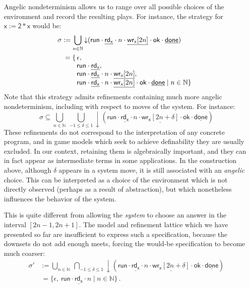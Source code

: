 \documentclass[sigplan,screen]{acmart}
\newcommand{\kw}[1]{\ensuremath{ \mathsf{#1} }}
\begin{document}
Angelic nondeterminism
allows us to range over all possible choices of the environment
and record the resulting plays.
For instance,
the strategy for $\kw{x := 2 * x}$
would be:
\begin{align*}
  \sigma &:=
    \bigcup_{n \in \mathbb{N}} {\downarrow}(
      \kw{run} \cdot
      \underline{\kw{rd}_\kw{x}} \cdot n \cdot
      \underline{\kw{wr}_\kw{x}[2n]} \cdot \kw{ok} \cdot
      \underline{\kw{done}}) \\
  &
      \begin{array}{l@{\,}l}
        = \{ & \epsilon, \\ &
        \kw{run} \cdot
        \underline{\kw{rd}_\kw{x}} ,
        \\ &
        \kw{run} \cdot
        \underline{\kw{rd}_\kw{x}} \cdot n \cdot
        \underline{\kw{wr}_\kw{x}[2n]} ,
        \\ &
        \kw{run} \cdot
        \underline{\kw{rd}_\kw{x}} \cdot n \cdot
        \underline{\kw{wr}_\kw{x}[2n]} \cdot \kw{ok} \cdot
        \underline{\kw{done}}
        \mid n \in \mathbb{N} \}
      \end{array}
\end{align*}
Note that this strategy admits refinements
containing much more angelic nondeterminism,
including with respect to moves of the system.
For instance:
\[
  \sigma \subseteq
    \bigcup_{n \in \mathbb{N}} \:
    \bigcup_{-1 \le \delta \le 1}
    {\downarrow}(
      \kw{run} \cdot
      \underline{\kw{rd}_\kw{x}} \cdot n \cdot
      \underline{\kw{wr}_\kw{x}[2n + \delta]} \cdot \kw{ok} \cdot
      \underline{\kw{done}})
\]
These refinements do not correspond to the interpretation
of any concrete program,
and in game models which seek to achieve definability
they are usually excluded.
In our context, retaining them is algebraically important,
and they can in fact appear as intermediate terms
in some applications.
In the construction above,
although $\delta$ appears in a system move,
it is still associated with an \emph{angelic} choice.
This can be interpreted as a choice of the environment
which is not directly observed
(perhaps as a result of abstraction),
but which nonetheless influences the behavior of the system.

This is quite different from allowing the \emph{system}
to choose an answer in the interval $[2n - 1, 2n + 1]$.
The model and refinement lattice which
we have presented so far are insufficient
to express such a specification,
because the downsets do not add enough meets,
forcing the would-be specification to become
much coarser:
\begin{align*}
  \sigma' &:=
    \bigcup_{n \in \mathbb{N}} \:
    \bigcap_{-1 \le \delta \le 1}
    {\downarrow}(
      \kw{run} \cdot
      \underline{\kw{rd}_\kw{x}} \cdot n \cdot
      \underline{\kw{wr}_\kw{x}[2n + \delta]} \cdot \kw{ok} \cdot
      \underline{\kw{done}}) \\
  & \, =
    \{ \epsilon,  \:
       \kw{run} \cdot \underline{\kw{rd}_\kw{x}} \cdot n
       \mid n \in \mathbb{N} \} \,.
\end{align*}
\end{document}
